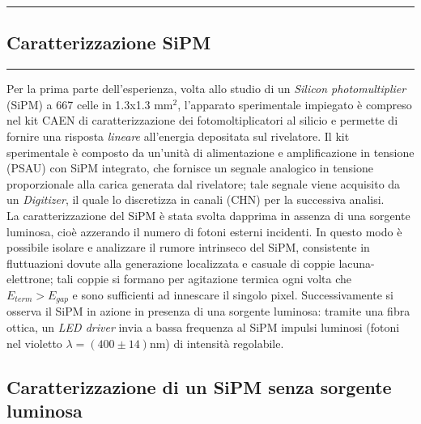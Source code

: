 \newpage
{\color{gray}\hrule}
\begin{center}
\section{Caratterizzazione SiPM}
\bigskip 
{\color{gray}\hrule}
\end{center}
Per la prima parte dell'esperienza, volta allo studio di un \textit{Silicon photomultiplier} (SiPM) a 667 celle in 1.3x1.3 mm$^2$, l'apparato sperimentale impiegato è compreso nel kit CAEN di caratterizzazione dei fotomoltiplicatori al silicio e permette di fornire una risposta \textit{lineare} all'energia depositata sul rivelatore. Il kit sperimentale è composto da un'unità di alimentazione e amplificazione in tensione (PSAU) con SiPM integrato, che fornisce un segnale analogico in tensione proporzionale alla carica generata dal rivelatore; tale segnale viene acquisito da un \textit{Digitizer}, il quale lo discretizza in canali (CHN) per la successiva analisi. \\
La caratterizzazione del SiPM è stata svolta dapprima in assenza di una sorgente luminosa, cioè azzerando il numero di fotoni esterni incidenti. In questo modo è possibile isolare e analizzare il rumore intrinseco del SiPM, consistente in fluttuazioni dovute alla generazione localizzata e casuale di coppie lacuna-elettrone; tali coppie si formano per agitazione termica ogni volta che $E_{term}>E_{gap}$ e sono sufficienti ad innescare il singolo pixel. Successivamente si osserva il SiPM in azione in presenza di una sorgente luminosa:  tramite una fibra ottica, un \textit{LED driver} invia a bassa frequenza al SiPM  impulsi luminosi (fotoni nel violetto $\lambda= (400 \pm 14)$nm) di intensità regolabile.

\subsection{Caratterizzazione di un SiPM senza sorgente luminosa}
